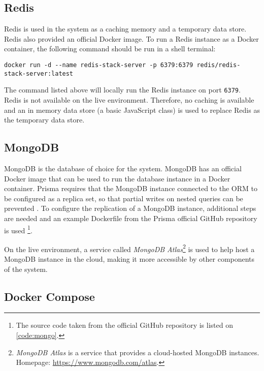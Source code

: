  \subsection{Redis}
 Redis is used in the system as a caching memory and a temporary data store. Redis also provided an official Docker image. To run a Redis instance as a Docker container, the following command should be run in a shell terminal:

 \begin{lstlisting}[caption={Running a Redis instance with Docker (Shell)}]
 docker run -d --name redis-stack-server -p 6379:6379 redis/redis-stack-server:latest
 \end{lstlisting}

 The command listed above will locally run the Redis instance on port \verb;6379;. Redis is not available on the live environment. Therefore, no caching is available and an in memory data store (a basic JavaScript class) is used to replace Redis as the temporary data store.

 \subsection{MongoDB}
 MongoDB is the database of choice for the system. MongoDB has an official Docker image that can be used to run the database instance in a Docker container. Prisma requires that the MongoDB instance connected to the ORM to be configured as a replica set, so that partial writes on nested queries can be prevented \autocite{primsa-mongo}. To configure the replication of a MongoDB instance, additional steps are needed and an example Dockerfile from the Prisma official GitHub repository is used \autocite{prisma-dockerfile}\footnote{The source code taken from the official GitHub repository is listed on \autoref{code:mongo}.}.

 On the live environment, a service called \emph{MongoDB Atlas}\footnote{\emph{MongoDB Atlas} is a service that provides a cloud-hosted MongoDB instances. Homepage: \url{https://www.mongodb.com/atlas}.} is used to help host a MongoDB instance in the cloud, making it more accessible by other components of the system.
 

 \subsection{Docker Compose}

